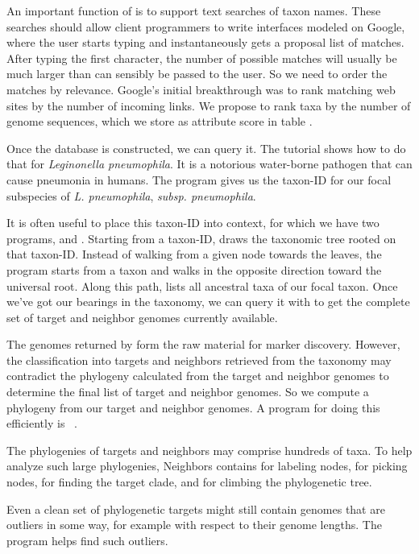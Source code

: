 An important function of  is to support text searches of
taxon names. These searches should allow client programmers to write
interfaces modeled on Google, where the user starts typing and
instantaneously gets a proposal list of matches. After typing the
first character, the number of possible matches will usually be much
larger than can sensibly be passed to the user. So we need to order
the matches by relevance. Google's initial breakthrough was to rank
matching web sites by the number of incoming links. We propose to rank
taxa by the number of genome sequences, which we store as attribute
score in table .

Once the database is constructed, we can query it. The tutorial shows
how to do that for \emph{Leginonella pneumophila}. It is a notorious
water-borne pathogen that can cause pneumonia in humans. The
program  gives us the taxon-ID for our focal subspecies
of \emph{L. pneumophila}, \emph{subsp. pneumophila}.

It is often useful to place this taxon-ID into context, for which we
have two programs,  and . Starting from a
taxon-ID,  draws the taxonomic tree rooted on that
taxon-ID. Instead of walking from a given node towards the leaves, the
program  starts from a taxon and walks in the opposite
direction toward the universal root. Along this path,  lists
all ancestral taxa of our focal taxon. Once we've got our bearings in
the taxonomy, we can query it with  to get the complete
set of target and neighbor genomes currently available.

The genomes returned by  form the raw material for
marker discovery. However, the classification into targets and
neighbors retrieved from the taxonomy may contradict the phylogeny
calculated from the target and neighbor genomes to determine the final
list of target and neighbor genomes. So we compute a phylogeny from
our target and neighbor genomes. A program for doing this efficiently
is ~\cite{klo20:phy}.

The phylogenies of targets and neighbors may comprise hundreds of
taxa. To help analyze such large phylogenies, Neighbors
contains  for labeling nodes,  for picking nodes,
 for finding the target clade, and  for climbing
the phylogenetic tree.

Even a clean set of phylogenetic targets might still contain genomes
that are outliers in some way, for example with respect to their
genome lengths. The program  helps find such
outliers.
